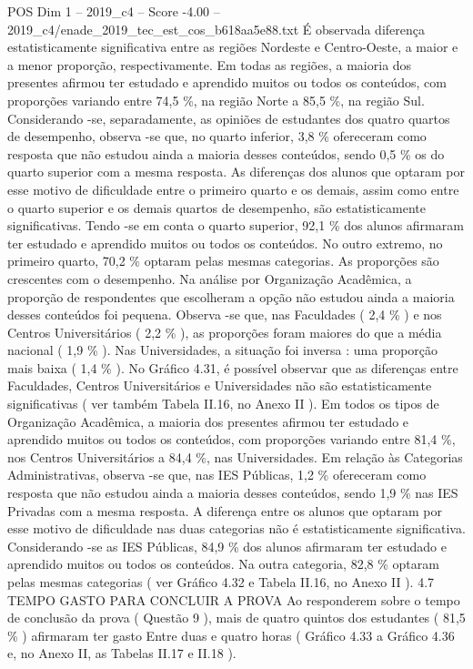 \begin{textsample}{POS Dim 1 – 2019\_c4 – Score -4.00 – 2019\_c4/enade\_2019\_tec\_est\_cos\_b618aa5e88.txt}
É observada diferença estatisticamente significativa entre as regiões Nordeste e Centro-Oeste, a maior e a menor proporção, respectivamente.
Em todas as regiões, a maioria dos presentes afirmou ter estudado e aprendido muitos ou todos os conteúdos, com proporções variando entre 74,5 \%, na região Norte a 85,5 \%, na região Sul.
Considerando -se, separadamente, as opiniões de estudantes dos quatro quartos de desempenho, observa -se que, no quarto inferior, 3,8 \% ofereceram como resposta que não estudou ainda a maioria desses conteúdos, sendo 0,5 \% os do quarto superior com a mesma resposta.
As diferenças dos alunos que optaram por esse motivo de dificuldade entre o primeiro quarto e os demais, assim como entre o quarto superior e os demais quartos de desempenho, são estatisticamente significativas.
Tendo -se em conta o quarto superior, 92,1 \% dos alunos afirmaram ter estudado e aprendido muitos ou todos os conteúdos.
No outro extremo, no primeiro quarto, 70,2 \% optaram pelas mesmas categorias.
As proporções são crescentes com o desempenho.
Na análise por Organização Acadêmica, a proporção de respondentes que escolheram a opção não estudou ainda a maioria desses conteúdos foi pequena.
Observa -se que, nas Faculdades ( 2,4 \% ) e nos Centros Universitários ( 2,2 \% ), as proporções foram maiores do que a média nacional ( 1,9 \% ).
Nas Universidades, a situação foi inversa : uma proporção mais baixa ( 1,4 \% ).
No Gráfico 4.31, é possível observar que as diferenças entre Faculdades, Centros Universitários e Universidades não são estatisticamente significativas ( ver também Tabela II.16, no Anexo II ).
Em todos os tipos de Organização Acadêmica, a maioria dos presentes afirmou ter estudado e aprendido muitos ou todos os conteúdos, com proporções variando entre 81,4 \%, nos Centros Universitários a 84,4 \%, nas Universidades.
Em relação às Categorias Administrativas, observa -se que, nas IES Públicas, 1,2 \% ofereceram como resposta que não estudou ainda a maioria desses conteúdos, sendo 1,9 \% nas IES Privadas com a mesma resposta.
A diferença entre os alunos que optaram por esse motivo de dificuldade nas duas categorias não é estatisticamente significativa.
Considerando -se as IES Públicas, 84,9 \% dos alunos afirmaram ter estudado e aprendido muitos ou todos os conteúdos.
Na outra categoria, 82,8 \% optaram pelas mesmas categorias ( ver Gráfico 4.32 e Tabela II.16, no Anexo II ). 4.7 TEMPO GASTO PARA CONCLUIR A PROVA Ao responderem sobre o tempo de conclusão da prova ( Questão 9 ), mais de quatro quintos dos estudantes ( 81,5 \% ) afirmaram ter gasto Entre duas e quatro horas ( Gráfico 4.33 a Gráfico 4.36 e, no Anexo II, as Tabelas II.17 e II.18 ).

\end{textsample}
